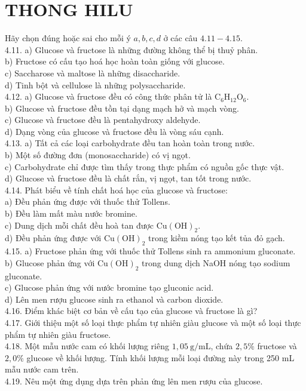 \documentclass[10pt]{article}
\begin{document}
\section*{THONG HILU}
Hãy chọn đúng hoặc sai cho mỗi ý $a, b, c, d$ ở các câu $4.11-4.15$.\\
4.11. a) Glucose và fructose là những đường không thể bị thuỷ phân.\\
b) Fructose có cấu tạo hoá học hoàn toàn giống với glucose.\\
c) Saccharose và maltose là những disaccharide.\\
d) Tinh bột và cellulose là những polysaccharide.\\
4.12. a) Glucose và fructose đều có công thức phân tử là $\mathrm{C}_{6} \mathrm{H}_{12} \mathrm{O}_{6}$.\\
b) Glucose và fructose đều tồn tại dạng mạch hở và mạch vòng.\\
c) Glucose và fructose đều là pentahydroxy aldehyde.\\
d) Dạng vòng của glucose và fructose đều là vòng sáu cạnh.\\
4.13. a) Tất cả các loại carbohydrate đều tan hoàn toàn trong nước.\\
b) Một số đường đơn (monosaccharide) có vị ngọt.\\
c) Carbohydrate chỉ được tìm thấy trong thực phẩm có nguồn gốc thực vật.\\
d) Glucose và fructose đều là chất rắn, vị ngọt, tan tốt trong nước.\\
4.14. Phát biểu về tính chất hoá học của glucose và fructose:\\
a) Đều phản ứng được với thuốc thử Tollens.\\
b) Đều làm mất màu nước bromine.\\
c) Dung dịch mỗi chất đều hoà tan được $\mathrm{Cu}(\mathrm{OH})_{2}$.\\
d) Đều phản ứng được với $\mathrm{Cu}(\mathrm{OH})_{2}$ trong kiềm nóng tạo kết tủa đỏ gạch.\\
4.15. a) Fructose phản ứng với thuốc thử Tollens sinh ra ammonium gluconate.\\
b) Glucose phản ứng với $\mathrm{Cu}(\mathrm{OH})_{2}$ trong dung dịch NaOH nóng tạo sodium gluconate.\\
c) Glucose phản ứng với nước bromine tạo gluconic acid.\\
d) Lên men rượu glucose sinh ra ethanol và carbon dioxide.\\
4.16. Điểm khác biệt cơ bản về cấu tạo của glucose và fructose là gì?\\
4.17. Giới thiệu một số loại thực phẩm tự nhiên giàu glucose và một số loại thực phẩm tự nhiên giàu fructose.\\
4.18. Một mẫu nước cam có khối lượng riêng $1,05 \mathrm{~g} / \mathrm{mL}$, chứa $2,5 \%$ fructose và $2,0 \%$ glucose về khối lượng. Tính khối lượng mỗi loại đường này trong 250 mL mẫu nước cam trên.\\
4.19. Nêu một ứng dụng dựa trên phản ứng lên men rượu của glucose.
\end{document}
